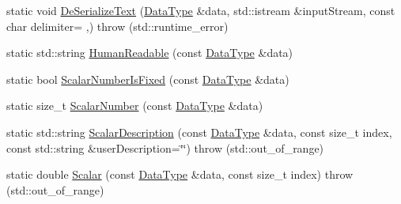 \begin{DoxyCompactItemize}
\item 
static void \hyperlink{classcmn_data_3_01svl_filter_source_video_capture_types_1_1_image_properties_01_4_a0bd38f7df9517c98b58dd33348d8fcd9}{De\+Serialize\+Text} (\hyperlink{classcmn_data_3_01svl_filter_source_video_capture_types_1_1_image_properties_01_4_a5e4f9ec9d3c7fa6c707332abbc73cf39}{Data\+Type} \&data, std\+::istream \&input\+Stream, const char delimiter= \textquotesingle{},\textquotesingle{})  throw (std\+::runtime\+\_\+error)
\item 
static std\+::string \hyperlink{classcmn_data_3_01svl_filter_source_video_capture_types_1_1_image_properties_01_4_a17546237926daae492fc9a51d9bb30a7}{Human\+Readable} (const \hyperlink{classcmn_data_3_01svl_filter_source_video_capture_types_1_1_image_properties_01_4_a5e4f9ec9d3c7fa6c707332abbc73cf39}{Data\+Type} \&data)
\item 
static bool \hyperlink{classcmn_data_3_01svl_filter_source_video_capture_types_1_1_image_properties_01_4_a157bdad2e001b8405d820d40482613d2}{Scalar\+Number\+Is\+Fixed} (const \hyperlink{classcmn_data_3_01svl_filter_source_video_capture_types_1_1_image_properties_01_4_a5e4f9ec9d3c7fa6c707332abbc73cf39}{Data\+Type} \&data)
\item 
static size\+\_\+t \hyperlink{classcmn_data_3_01svl_filter_source_video_capture_types_1_1_image_properties_01_4_a209a25514f3c8fe8077e1c044e2655cd}{Scalar\+Number} (const \hyperlink{classcmn_data_3_01svl_filter_source_video_capture_types_1_1_image_properties_01_4_a5e4f9ec9d3c7fa6c707332abbc73cf39}{Data\+Type} \&data)
\item 
static std\+::string \hyperlink{classcmn_data_3_01svl_filter_source_video_capture_types_1_1_image_properties_01_4_a9bd51f7646a86913036415e7a96613e9}{Scalar\+Description} (const \hyperlink{classcmn_data_3_01svl_filter_source_video_capture_types_1_1_image_properties_01_4_a5e4f9ec9d3c7fa6c707332abbc73cf39}{Data\+Type} \&data, const size\+\_\+t index, const std\+::string \&user\+Description=\char`\"{}\char`\"{})  throw (std\+::out\+\_\+of\+\_\+range)
\item 
static double \hyperlink{classcmn_data_3_01svl_filter_source_video_capture_types_1_1_image_properties_01_4_a5e706d5ab6750a39e489caa4bbc385a2}{Scalar} (const \hyperlink{classcmn_data_3_01svl_filter_source_video_capture_types_1_1_image_properties_01_4_a5e4f9ec9d3c7fa6c707332abbc73cf39}{Data\+Type} \&data, const size\+\_\+t index)  throw (std\+::out\+\_\+of\+\_\+range)
\end{DoxyCompactItemize}


